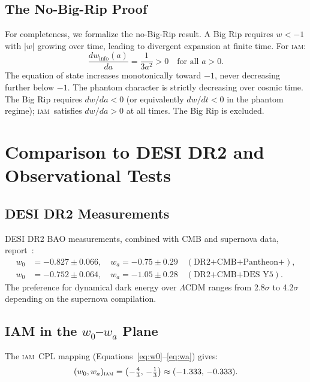 \documentclass[12pt,letterpaper]{article}
\newcommand{\IAM}{\textsc{iam}}
\newcommand{\winfo}{w_{\mathrm{info}}(a)}
\begin{document}
\subsection{The No-Big-Rip Proof}

For completeness, we formalize the no-Big-Rip result. A Big Rip requires $w < -1$ with $|w|$ growing over time, leading to divergent expansion at finite time. For \IAM:
\begin{equation}
    \frac{d\winfo}{da} = \frac{1}{3a^2} > 0 \quad \text{for all } a > 0.
    \label{eq:dwda}
\end{equation}
The equation of state increases monotonically toward $-1$, never decreasing further below $-1$. The phantom character is strictly decreasing over cosmic time. The Big Rip requires $dw/da < 0$ (or equivalently $dw/dt < 0$ in the phantom regime); \IAM\ satisfies $dw/da > 0$ at all times. The Big Rip is excluded.

\section{Comparison to DESI DR2 and Observational Tests}
\label{sec:desi}

\subsection{DESI DR2 Measurements}

DESI DR2 BAO measurements, combined with CMB and supernova data, report~\citep{DESIDR2_2025}:
\begin{align}
    w_0 &= -0.827 \pm 0.066,\quad w_a = -0.75 \pm 0.29 \quad (\text{DR2+CMB+Pantheon+}), \\
    w_0 &= -0.752 \pm 0.064,\quad w_a = -1.05 \pm 0.28 \quad (\text{DR2+CMB+DES~Y5}).
\end{align}
The preference for dynamical dark energy over $\Lambda$CDM ranges from 2.8$\sigma$ to 4.2$\sigma$ depending on the supernova compilation.

\subsection{IAM in the $w_0$--$w_a$ Plane}

The \IAM\ CPL mapping (Equations~\ref{eq:w0}--\ref{eq:wa}) gives:
\begin{equation}
    (w_0, w_a)_{\IAM} = \left(-\tfrac{4}{3},\, -\tfrac{1}{3}\right) \approx (-1.333,\, -0.333).
    \label{eq:IAM_CPL}
\end{equation}
\end{document}
